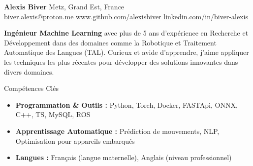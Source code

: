 \documentclass{resume} %
\begin{document}
\begin{center}
    {\Huge \textbf{Alexis Biver}} \hspace{5cm} Metz, Grand Est, France \\
    \href{mailto:biver.alexis@proton.me}{biver.alexis@proton.me}   \hspace{1cm}     \href{https://github.com/alexisbiver}{www.github.com/alexisbiver}  \hspace{1cm} \href{https://linkedin.com/in/biver-alexis}{linkedin.com/in/biver-alexis}
\end{center}

\vspace{0.5cm}
\begin{center}
\textbf{Ingénieur Machine Learning} avec plus de 5 ans d'expérience en Recherche et Développement dans des domaines comme la Robotique et Traitement Automatique des Langues (TAL).
Curieux et avide d'apprendre, j'aime appliquer les techniques les plus récentes pour développer des solutions innovantes dans divers domaines.
\end{center}

\begin{rSection}{Compétences Clés}
\begin{itemize}
    \item \textbf{Programmation \& Outils :} Python, Torch, Docker, FASTApi, ONNX, C++, TS, MySQL, ROS
    \item \textbf{Apprentissage Automatique :} Prédiction de mouvements, NLP, Optimisation pour appareils embarqués
    \item \textbf{Langues :} Français (langue maternelle), Anglais (niveau professionnel)
\end{itemize}
\end{rSection}
\end{document}

